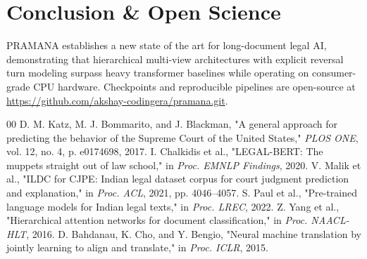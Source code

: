 \documentclass[journal,10pt,twocolumn]{IEEEtran}
\begin{document}
\section{Conclusion & Open Science}
PRAMANA establishes a new state of the art for long-document legal AI, demonstrating that hierarchical multi-view architectures with explicit reversal turn modeling surpass heavy transformer baselines while operating on consumer-grade CPU hardware. Checkpoints and reproducible pipelines are open-source at \url{https://github.com/akshay-codingera/pramana.git}.

\begin{thebibliography}{00}
 D. M. Katz, M. J. Bommarito, and J. Blackman, "A general approach for predicting the behavior of the Supreme Court of the United States," \textit{PLOS ONE}, vol. 12, no. 4, p. e0174698, 2017.
 I. Chalkidis et al., "LEGAL-BERT: The muppets straight out of law school," in \textit{Proc. EMNLP Findings}, 2020.
 V. Malik et al., "ILDC for CJPE: Indian legal dataset corpus for court judgment prediction and explanation," in \textit{Proc. ACL}, 2021, pp. 4046--4057.
 S. Paul et al., "Pre-trained language models for Indian legal texts," in \textit{Proc. LREC}, 2022.
 Z. Yang et al., "Hierarchical attention networks for document classification," in \textit{Proc. NAACL-HLT}, 2016.
 D. Bahdanau, K. Cho, and Y. Bengio, "Neural machine translation by jointly learning to align and translate," in \textit{Proc. ICLR}, 2015.
\end{thebibliography}
\end{document}
